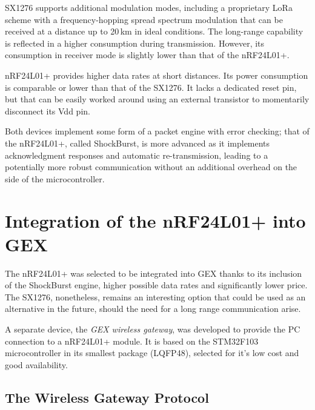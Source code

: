 SX1276 supports additional modulation modes, including a proprietary LoRa scheme with a frequency-hopping spread spectrum modulation that can be received at a distance up to 20\,km in ideal conditions. The long-range capability is reflected in a higher consumption during transmission. However, its consumption in receiver mode is slightly lower than that of the nRF24L01+.

nRF24L01+ provides higher data rates at short distances. Its power consumption is comparable or lower than that of the SX1276. It lacks a dedicated reset pin, but that can be easily worked around using an external transistor to momentarily disconnect its Vdd pin.

Both devices implement some form of a packet engine with error checking; that of the nRF24L01+, called ShockBurst, is more advanced as it implements acknowledgment responses and automatic re-transmission, leading to a potentially more robust communication without an additional overhead on the side of the microcontroller. 


\section{Integration of the nRF24L01+ into GEX}

The nRF24L01+ was selected to be integrated into GEX thanks to its inclusion of the ShockBurst engine, higher possible data rates and significantly lower price. The SX1276, nonetheless, remains an interesting option that could be used as an alternative in the future, should the need for a long range communication arise.

A separate device, the \textit{GEX wireless gateway}, was developed to provide the PC connection to a nRF24L01+ module. It is based on the STM32F103 microcontroller in its smallest package (LQFP48), selected for it's low cost and good availability.

\subsection{The Wireless Gateway Protocol}

